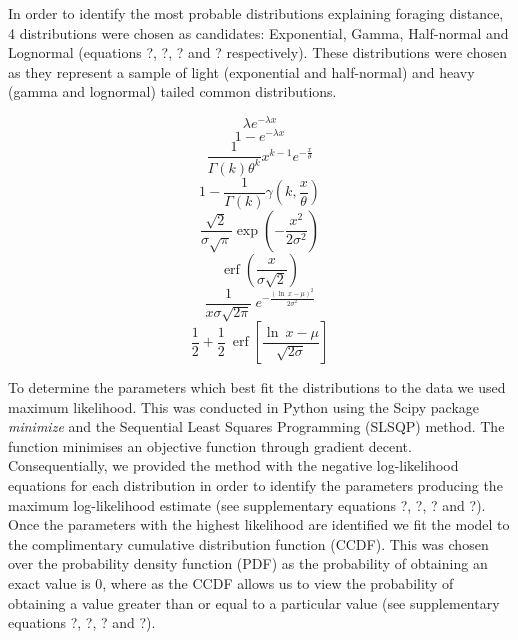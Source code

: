 \documentclass[11pt,usenames,dvipsnames,a4paper]{article}
\DeclareMathOperator\erf{erf}
\begin{document}
\begin{linenumbers}
\hspace{\parindent}
In order to identify the most probable distributions explaining foraging distance, 4 distributions were chosen as candidates: Exponential, Gamma, Half-normal and Lognormal (equations ?, ?, ? and ? respectively). These distributions were chosen as they represent a sample of light (exponential and half-normal) and heavy (gamma and lognormal) tailed common distributions.
\end{linenumbers}
\begin{equation}
\lambda e^{-\lambda x}
\end{equation}
\begin{equation}
1 - e^{-\lambda x}
\end{equation}
\begin{equation}
\frac{1}{\Gamma(k)\theta^k}x^{k-1}e^{-\frac{x}{\theta}}
\end{equation}
\begin{equation}
1 - \frac{1}{\Gamma(k)}\gamma(k,\frac{x}{\theta})
\end{equation}
\begin{equation}
\frac{\sqrt{2}}{\sigma \sqrt{\pi}} \exp \left(-\frac{x^2}{2 \sigma^2}\right)
\end{equation}
\begin{equation}
\erf\left(\frac{x}{\sigma \sqrt{2}}\right)
\end{equation}
\begin{equation}
\frac{1}{x \sigma \sqrt{2 \pi}}\ e^{- \frac{(\ln\ x - \mu)^2}{2\sigma^2}}
\end{equation}
\begin{equation}
\frac{1}{2} + \frac{1}{2}\ \erf\left[\frac{\ln\ x - \mu}{\sqrt{2 \sigma}}\right]
\end{equation}

\begin{linenumbers}
To determine the parameters which best fit the distributions to the data we used maximum likelihood. This was conducted in Python using the Scipy package \textit{minimize} and the Sequential Least Squares Programming (SLSQP) method. The function minimises an objective function through gradient decent. Consequentially, we provided the method with the negative log-likelihood equations for each distribution in order to identify the parameters producing the maximum log-likelihood estimate (see supplementary equations ?, ?, ? and ?). Once the parameters with the highest likelihood are identified we fit the model to the complimentary cumulative distribution function (CCDF). This was chosen over the probability density function (PDF) as the probability of obtaining an exact value is 0, where as the CCDF allows us to view the probability of obtaining a value greater than or equal to a particular value (see supplementary equations ?, ?, ? and ?). 
\end{linenumbers}
\end{document}
